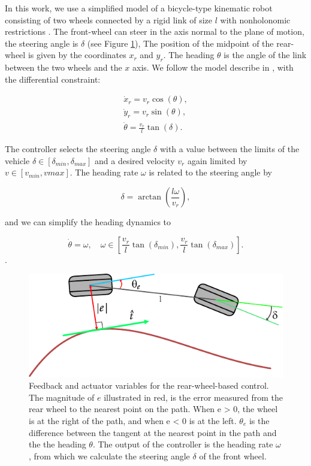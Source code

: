 \documentclass[symmetry,article,submit,moreauthors,pdftex]{Definitions/mdpi}
\begin{document}
In this work, we use a simplified model of a bicycle-type kinematic robot
consisting of two wheels connected by a rigid link of size $l$ with
nonholonomic restrictions \cite{pamucar_vehicle_2018,de1998feedback}.  The
front-wheel can steer in the axis normal to the plane of motion, the steering
angle is $\delta$ (see Figure \ref{fig:kinematics}), The position of the
midpoint of the rear-wheel is given by the coordinates $x_r$ and $y_r$. The
heading $\theta$ is the angle of the link between the two wheels and the $x$
axis.  We follow the model describe in \cite{paden_survey_2016}, with the
differential constraint:

\begin{equation}
    \begin{matrix}
        \dot{x}_{r}  = v_r \cos (\theta),\\ 
        \dot{y}_{r}  = v_r \sin (\theta),\\
        \dot{\theta} = \frac{v_r}{l} \tan (\delta).
    \end{matrix}
\end{equation}

The controller selects the steering angle $\delta$ with a value between the
limits of the vehicle $\delta \in [\delta_{min},\delta_{max}]$ and a desired
velocity $v_r$ again limited by $v\in [v_{min},v{max}]$. The heading rate
$\omega$ is related to the steering angle by 

\begin{equation}
       \delta = \arctan \left(\frac{l\omega}{v_r}\right),
\end{equation}

and we can simplify the heading dynamics to 

\begin{equation}
    \dot{\theta} = \omega,\quad \omega \in \left[\frac{v_r}{l} \tan(\delta_{min}),\frac{v_r}{l} \tan(\delta_{max} ) \right].
\end{equation}.

\begin{figure}[H] \includegraphics[width=10.5 cm]{img/path} \caption{ Feedback
        and actuator variables for the rear-wheel-based control. The magnitude
        of $e$ illustrated in red, is the error measured from the rear wheel to
        the nearest point on the path. When e > 0, the wheel is at the right of
        the path, and when e < 0 is at the left. $\theta_e$ is the
        difference between the tangent at the nearest point in the path and the
        the heading $\theta$. The output of the controller is the heading rate
        $\omega$, from which we calculate the steering angle $\delta$ of the front wheel.
}\label{fig:kinematics}    \end{figure} 
\end{document}
